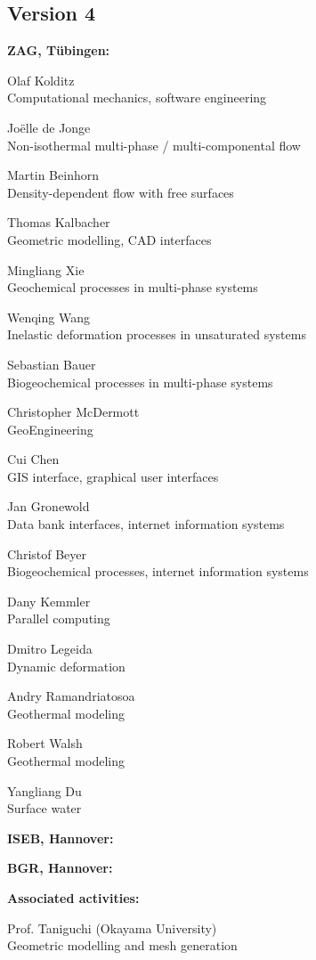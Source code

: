 \subsection*{Version 4}

{\bf ZAG, T\"{u}bingen:}
\begin{list}{}{\setlength{\itemindent}{-.5cm}}
\item  Olaf Kolditz \\ Computational mechanics, software engineering
\item  Jo\"elle de Jonge \\ Non-isothermal multi-phase /
multi-componental flow
\item  Martin Beinhorn \\ Density-dependent flow with free surfaces
\item  Thomas Kalbacher \\ Geometric modelling, CAD interfaces
\item  Mingliang Xie \\ Geochemical processes in multi-phase systems
\item  Wenqing Wang \\ Inelastic deformation processes in unsaturated
systems
\item  Sebastian Bauer \\ Biogeochemical processes in multi-phase systems
\item  Christopher McDermott \\ GeoEngineering
\item  Cui Chen \\ GIS interface, graphical user interfaces
\item  Jan Gronewold \\ Data bank interfaces, internet information
systems
\item  Christof Beyer \\ Biogeochemical processes, internet information
systems
\item  Dany Kemmler \\ Parallel computing
\item  Dmitro Legeida \\ Dynamic deformation
\item  Andry Ramandriatosoa \\ Geothermal modeling
\item  Robert Walsh \\ Geothermal modeling
\item  Yangliang Du \\ Surface water
\end{list}

{\bf ISEB, Hannover:}

{\bf BGR, Hannover:}

{\bf Associated activities:}
\begin{list}{}{\setlength{\itemindent}{-.5cm}}
\item  Prof. Taniguchi (Okayama University) \\
    Geometric modelling and mesh generation
\end{list}


